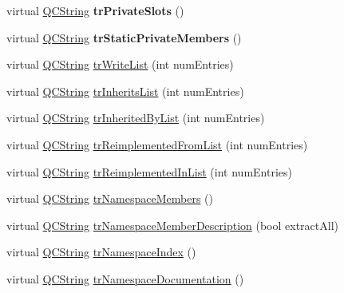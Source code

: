 \begin{DoxyCompactItemize}
\item 
\mbox{\label{class_translator_portuguese_ae1cd478bcf0754b10d13f900d92363fc}} 
virtual \mbox{\hyperlink{class_q_c_string}{Q\+C\+String}} {\bfseries tr\+Private\+Slots} ()
\item 
\mbox{\label{class_translator_portuguese_a6486d47beb251809cd0cd91f95744834}} 
virtual \mbox{\hyperlink{class_q_c_string}{Q\+C\+String}} {\bfseries tr\+Static\+Private\+Members} ()
\item 
virtual \mbox{\hyperlink{class_q_c_string}{Q\+C\+String}} \mbox{\hyperlink{class_translator_portuguese_a771f788b30c419b14172504ca0299ce7}{tr\+Write\+List}} (int num\+Entries)
\item 
virtual \mbox{\hyperlink{class_q_c_string}{Q\+C\+String}} \mbox{\hyperlink{class_translator_portuguese_ab6bb422e47718ce45298b9cf1f5088ff}{tr\+Inherits\+List}} (int num\+Entries)
\item 
virtual \mbox{\hyperlink{class_q_c_string}{Q\+C\+String}} \mbox{\hyperlink{class_translator_portuguese_ac930caa238de978d60de05dcb2050233}{tr\+Inherited\+By\+List}} (int num\+Entries)
\item 
virtual \mbox{\hyperlink{class_q_c_string}{Q\+C\+String}} \mbox{\hyperlink{class_translator_portuguese_ac1cc35e342cd1c3e9b97816cb5458917}{tr\+Reimplemented\+From\+List}} (int num\+Entries)
\item 
virtual \mbox{\hyperlink{class_q_c_string}{Q\+C\+String}} \mbox{\hyperlink{class_translator_portuguese_aaf262ebbeb4dc61cf9df31a8f7cd5ff2}{tr\+Reimplemented\+In\+List}} (int num\+Entries)
\item 
virtual \mbox{\hyperlink{class_q_c_string}{Q\+C\+String}} \mbox{\hyperlink{class_translator_portuguese_a9744a501cca3572f9c069c321abab9cf}{tr\+Namespace\+Members}} ()
\item 
virtual \mbox{\hyperlink{class_q_c_string}{Q\+C\+String}} \mbox{\hyperlink{class_translator_portuguese_adcd31f154058950cfc7035282f6599fb}{tr\+Namespace\+Member\+Description}} (bool extract\+All)
\item 
virtual \mbox{\hyperlink{class_q_c_string}{Q\+C\+String}} \mbox{\hyperlink{class_translator_portuguese_a99cccfbd85b7dd8610e9cd4647dccfa3}{tr\+Namespace\+Index}} ()
\item 
virtual \mbox{\hyperlink{class_q_c_string}{Q\+C\+String}} \mbox{\hyperlink{class_translator_portuguese_adcbf36c3e119120b2b48b87eb20384eb}{tr\+Namespace\+Documentation}} ()

\end{DoxyCompactItemize}
